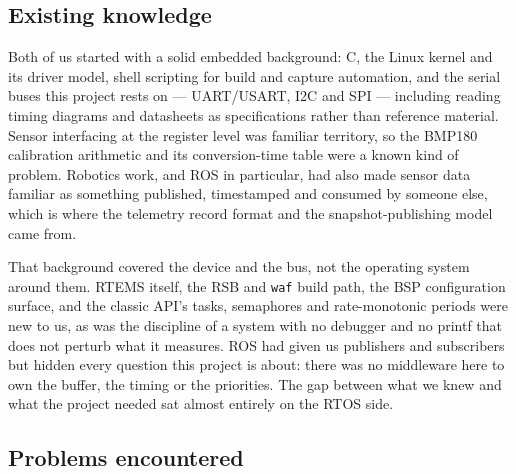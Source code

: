 \documentclass[10pt,a4]{article}
\begin{document}
\subsection{Existing knowledge}

Both of us started with a solid embedded background: C, the Linux kernel and its
driver model, shell scripting for build and capture automation, and the serial
buses this project rests on --- UART/USART, I2C and SPI --- including reading
timing diagrams and datasheets as specifications rather than reference material.
Sensor interfacing at the register level was familiar territory, so the BMP180
calibration arithmetic and its conversion-time table were a known kind of
problem. Robotics work, and ROS in particular, had also made sensor data
familiar as something published, timestamped and consumed by someone else,
which is where the telemetry record format and the snapshot-publishing model
came from.

That background covered the device and the bus, not the operating system around
them. RTEMS itself, the RSB and \texttt{waf} build path, the BSP configuration
surface, and the classic API's tasks, semaphores and rate-monotonic periods were
new to us, as was the discipline of a system with no debugger and no printf that
does not perturb what it measures. ROS had given us publishers and subscribers
but hidden every question this project is about: there was no middleware here to
own the buffer, the timing or the priorities. The gap between what we knew and what the
project needed sat almost entirely on the RTOS side.

\subsection{Problems encountered}
\label{sec:problems}
\end{document}
